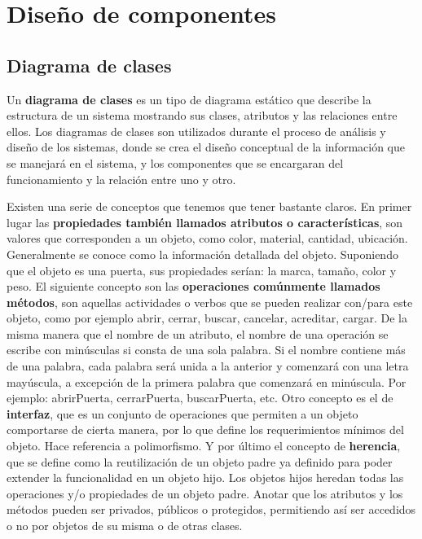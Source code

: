 \section{Diseño de componentes} %
\label{sec:diseno_de_componentes}

		\subsection{Diagrama de clases} %
		\label{sec:diagrama_de_clases}

			Un \textbf{diagrama de clases} es un tipo de diagrama estático que describe la estructura de un sistema mostrando sus clases, atributos y las relaciones entre ellos. Los diagramas de clases son utilizados durante el proceso de análisis y diseño de los sistemas, donde se crea el diseño conceptual de la información que se manejará en el sistema, y los componentes que se encargaran del funcionamiento y la relación entre uno y otro.

			Existen una serie de conceptos que tenemos que tener bastante claros. En primer lugar las \textbf{propiedades también llamados atributos o características}, son valores que corresponden a un objeto, como color, material, cantidad, ubicación. Generalmente se conoce como la información detallada del objeto. Suponiendo que el objeto es una puerta, sus propiedades serían: la marca, tamaño, color y peso.	El siguiente concepto son las \textbf{operaciones comúnmente llamados métodos}, son aquellas actividades o verbos que se pueden realizar con/para este objeto, como por ejemplo abrir, cerrar, buscar, cancelar, acreditar, cargar. De la misma manera que el nombre de un atributo, el nombre de una operación se escribe con minúsculas si consta de una sola palabra. Si el nombre contiene más de una palabra, cada palabra será unida a la anterior y comenzará con una letra mayúscula, a excepción de la primera palabra que comenzará en minúscula. Por ejemplo: abrirPuerta, cerrarPuerta, buscarPuerta, etc. Otro concepto es el de \textbf{interfaz}, que es un conjunto de operaciones que permiten a un objeto comportarse de cierta manera, por lo que define los requerimientos mínimos del objeto. Hace referencia a polimorfismo. Y por último el concepto de \textbf{herencia}, que se define como la reutilización de un objeto padre ya definido para poder extender la funcionalidad en un objeto hijo. Los objetos hijos heredan todas las operaciones y/o propiedades de un objeto padre. Anotar que los atributos y los métodos pueden ser privados, públicos o protegidos, permitiendo así ser accedidos o no por objetos de su misma o de otras clases. 

